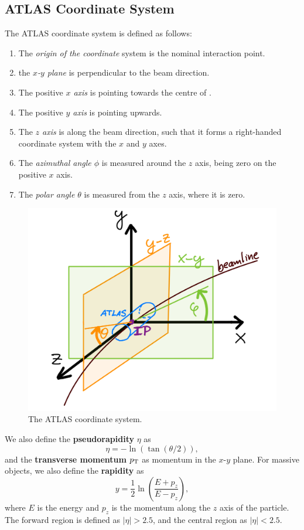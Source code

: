 \subsection{ATLAS Coordinate System}
\label{sec:atlas_coord}
The ATLAS coordinate system is defined as follows:
\begin{enumerate}
    \item The \emph{origin of the coordinate} system is the nominal interaction point.
    \item the \emph{$x$-$y$ plane} is perpendicular to the beam direction.
    \item The positive \emph{$x$ axis} is pointing towards the centre of \LHC.
    \item The positive \emph{$y$ axis} is pointing upwards.
    \item The \emph{$z$ axis} is along the beam direction, such that it forms a right-handed coordinate system with the $x$ and $y$ axes.
    \item The \emph{azimuthal angle $\phi$} is measured around the $z$ axis, being zero on the positive $x$ axis.
    \item The \emph{polar angle $\theta$} is measured from the $z$ axis, where it is zero.
\end{enumerate}
\begin{figure}[htb]
    \centering
    \includegraphics[width=0.7\linewidth]{src/img/ATLAS_coords.jpeg}
    \caption{The ATLAS coordinate system.}
    \label{fig:atlas_coord}
\end{figure}

We also define the \textbf{pseudorapidity} $\eta$ as 
\begin{equation}
    \label{eq:pseudorapidity}
    \eta = -\ln(\tan(\theta/2)),
\end{equation}
and the \textbf{transverse momentum} $p_\text{T}$ as momentum in the $x$-$y$ plane.
For massive objects, we also define the \textbf{rapidity} as
\begin{equation}
    \label{eq:rapidity}
    y = \frac{1}{2} \ln\left(\frac{E + p_z}{E - p_z}\right),
\end{equation}
where $E$ is the energy and $p_z$ is the momentum along the $z$ axis of the particle.
The forward region is defined as $|\eta| > 2.5$, and the central region as $|\eta| < 2.5$.

